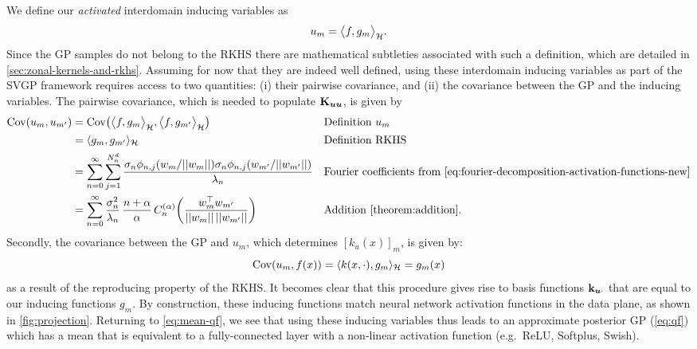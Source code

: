 We define our \emph{activated} interdomain inducing variables as
\begin{equation}
\label{eq:def-inducing-variable}
    u_m = \big\langle f, {g}_m \big\rangle_{{\mathcal{H}}}.
\end{equation}
Since the GP samples do not belong to the RKHS there are mathematical subtleties associated with such a definition, which are detailed in \cref{sec:zonal-kernels-and-rkhs}. Assuming for now that they are indeed well defined, using these interdomain inducing variables as part of the SVGP framework requires access to two quantities: (i) their pairwise covariance, and (ii) the covariance between the GP and the inducing variables. The pairwise covariance, which is needed to populate $\mathbf{{K}}_{\bm{u} \bm{u}}$, is given by
\begin{align}
\label{eq:kuu}
\Cov(u_{m}, u_{m'})  
&= \Cov \left( \big\langle f, {g}_m \big\rangle_\rkhs, \big\langle f, {g}_{m'} \big\rangle_\rkhs \right) \nonumber && \text{Definition $u_m$} \\
&= \langle {g}_m, {g}_{m'} \rangle_\rkhs \nonumber && \text{Definition RKHS} \\
&= \sum_{{n=0}}^{\infty} \sum_{j=1}^{\dnumharmonicsforlevel} \frac{\sigma_n \phi_{n,j}({w_m / \norm{w_m}}) \sigma_n \phi_{n,j}({w_{m'} / \norm{w_{m'}}})}{\lambda_n} \nonumber && \text{Fourier coefficients from \cref{eq:fourier-decomposition-activation-functions-new}} \\
&= \sum_{{n=0}}^{\infty}
    \frac{\sigma_n^2}{\lambda_n}\,\frac{n + \alpha}{\alpha}\,C_n^{(\alpha)}\left(\frac{w_m^\top w_{m'}}{\norm{w_m}\,\norm{w_{m'}}}\right) && \text{Addition \cref{theorem:addition}}.
\end{align}
Secondly, the covariance between the GP and $u_m$, which determines $[k_u(x)]_m$, is given by:
\begin{equation}
\label{eq:kuf}
  \mathrm{Cov}(u_m, f(x)) = 
    \langle k(x, \cdot), {g}_m \rangle_{{\mathcal{H}}} = {g}_m(x) 
\end{equation}
as a result of the reproducing property of the RKHS. It becomes clear that this procedure gives rise to basis functions $\mathbf{k}_{\bm{u} \cdot}$ that are equal to our inducing functions $g_m$. By construction, these inducing functions match neural network activation functions in the data plane, as shown in \cref{fig:projection}. Returning to \cref{eq:mean-qf}, we see that using these inducing variables thus leads to an approximate posterior GP (\cref{eq:qf}) which has a mean that is equivalent to a fully-connected layer with a non-linear activation function (e.g.~ReLU, Softplus, Swish). 


